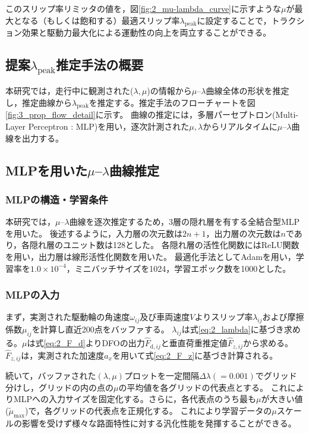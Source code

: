 \documentclass[dvipdfmx,usejistfm]{ieej-tec2}
\begin{document}
このスリップ率リミッタの値を，図\ref{fig:2_mu-lambda_curve}に示すような$\mu$が最大となる（もしくは飽和する）最適スリップ率$\lambda_\mathrm{peak}$に設定することで，トラクション効果と駆動力最大化による運動性の向上を両立することができる。


\subsection{提案$\lambda_\mathrm{peak}$推定手法の概要}

本研究では，走行中に観測された($\lambda, \mu$)の情報から$\mu$--$\lambda$曲線全体の形状を推定し，推定曲線から$\lambda_\mathrm{peak}$を推定する。推定手法のフローチャートを図\ref{fig:3_prop_flow_detail}に示す。
曲線の推定には，多層パーセプトロン(Multi-Layer Perceptron : MLP)を用い，逐次計測された$\mu, \lambda$からリアルタイムに$\mu$--$\lambda$曲線を出力する。


\subsection{MLPを用いた$\mu$--$\lambda$曲線推定}
\subsubsection{MLPの構造・学習条件}
本研究では，$\mu$--$\lambda$曲線を逐次推定するため，3層の隠れ層を有する全結合型MLPを用いた。
後述するように，入力層の次元数は$2n+1$，出力層の次元数は$n$であり，各隠れ層のユニット数は128とした。
各隠れ層の活性化関数にはReLU関数を用い，出力層は線形活性化関数を用いた。
最適化手法としてAdam\cite{kingma}を用い，学習率を$1.0\times10^{-4}$，ミニバッチサイズを1024，学習エポック数を1000とした。

\subsubsection{MLPの入力}
まず，実測された駆動輪の角速度$\omega_{ij}$及び車両速度$V$よりスリップ率$\lambda_{ij}$および摩擦係数$\mu_{ij}$を計算し直近200点をバッファする。
$\lambda_{ij}$は式\ref{eq:2_lambda}に基づき求める。$\mu$は式\ref{eq:2_F_d}よりDFOの出力$\hat{F}_{\mathrm{d},ij}$と垂直荷重推定値$\hat{F}_{z,ij}$から求める。
$\hat{F}_{z,ij}$は，実測された加速度$a_x$を用いて式\ref{eq:2_F_z}に基づき計算される。

続いて，バッファされた$(\lambda, \mu)$プロットを一定間隔$\Delta \lambda (= 0.001)$でグリッド分けし，グリッドの内の点の$\mu$の平均値を各グリッドの代表点とする。
これによりMLPへの入力サイズを固定化する。さらに，各代表点のうち最も$\mu$が大きい値($\tilde{\mu}_\mathrm{max}$)で，各グリッドの代表点を正規化する。
これにより学習データの$\mu$スケールの影響を受けず様々な路面特性に対する汎化性能を発揮することができる。
\end{document}
